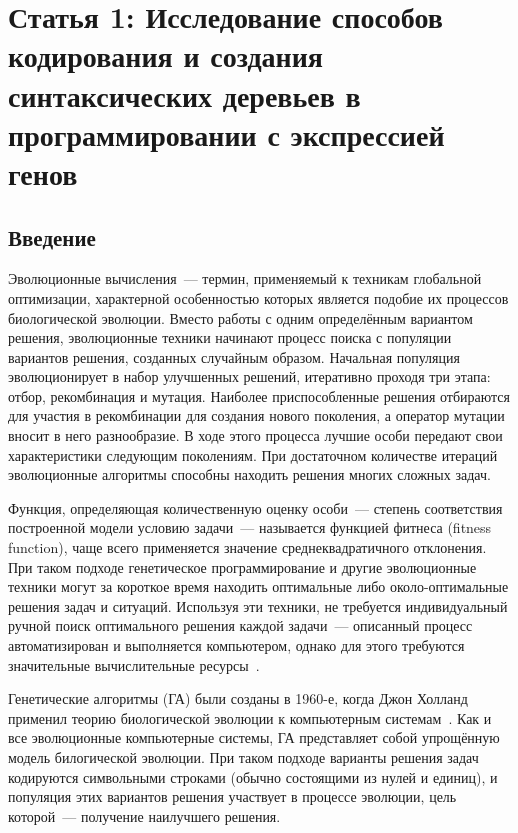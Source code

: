 \section{Статья 1: Исследование способов кодирования и создания синтаксических деревьев в программировании с экспрессией генов}

\subsection{Введение}

Эволюционные вычисления~--- термин, применяемый к техникам глобальной оптимизации, характерной особенностью которых является подобие их процессов биологической эволюции. Вместо работы с одним определённым вариантом решения, эволюционные техники начинают процесс поиска с популяции вариантов решения, созданных случайным образом. Начальная популяция эволюционирует в набор улучшенных решений, итеративно проходя три этапа: отбор, рекомбинация и мутация. Наиболее приспособленные решения отбираются для участия в рекомбинации для создания нового поколения, а оператор мутации вносит в него разнообразие. В ходе этого процесса лучшие особи передают свои характеристики следующим поколениям. При достаточном количестве итераций эволюционные алгоритмы способны находить решения многих сложных задач.

Функция, определяющая количественную оценку особи~--- степень соответствия построенной модели условию задачи~--- называется функцией фитнеса (fitness function), чаще всего применяется значение среднеквадратичного отклонения. При таком подходе генетическое программирование и другие эволюционные техники могут за короткое время находить оптимальные либо около-оптимальные решения задач и ситуаций. Используя эти техники, не требуется индивидуальный ручной поиск оптимального решения каждой задачи~--- описанный процесс автоматизирован и выполняется компьютером, однако для этого требуются значительные вычислительные ресурсы~\cite{Nunez:2006:msoec}.

Генетические алгоритмы (ГА) были созданы в 1960-е, когда Джон Холланд применил теорию биологической эволюции к компьютерным системам~\cite{Holland:1975}. Как и все эволюционные компьютерные системы, ГА представляет собой упрощённую модель билогической эволюции. При таком подходе варианты решения задач кодируются символьными строками (обычно состоящими из нулей и единиц), и популяция этих вариантов решения участвует в процессе эволюции, цель которой~--- получение наилучшего решения.


